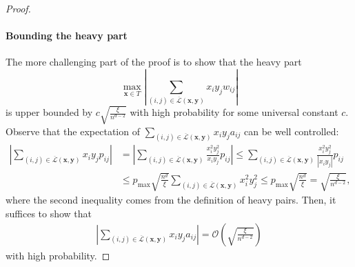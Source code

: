 \documentclass{article}
\theoremstyle{plain}
\theoremstyle{definition}
\theoremstyle{remark}
\newcommand{\OCal}{\mathcal{O}}
\def\bx{\bm{x}}
\def\by{\bm{y}}
\begin{document}
\begin{appendix}
\begin{center}
\begin{proof}
			\paragraph{Bounding the heavy part} The more challenging part of the proof is to show that the heavy part
			\[
			\max_{\bx \in T} \left|\sum_{ (i,j)\in {\overline{\mathcal{L}}(\bx, \by) }} x_i y_j w_{ij} \right|
			\]
			is upper bounded by $c \sqrt{\frac{\xi}{n^{d-2}}}$ with high probability for some universal constant $c$. Observe that the expectation of $\sum_{ (i,j)\in {\overline{\mathcal{L}}(\bx, \by) }} x_i y_j a_{ij}$ can be well controlled:
			\begin{align*}
				\left|\sum_{ (i,j)\in {\overline{\mathcal{L}}(\bx, \by) }} x_i y_j p_{ij} \right| & = \left|\sum_{ (i,j)\in {\overline{\mathcal{L}}(\bx, \by) }} \frac{x_i^2 y_j^2}{x_iy_j} p_{ij} \right| \leq \sum_{ (i,j)\in {\overline{\mathcal{L}}(\bx, \by) }} \frac{x_i^2 y_j^2}{|x_iy_j|} p_{ij}\\
				& \leq p_{\max} \sqrt{\frac{n^{d}}{\xi}}\sum_{ (i,j)\in {\overline{\mathcal{L}}(\bx, \by) }}x_i^2 y_j^2 \leq p_{\max} \sqrt{\frac{n^{d}}{\xi}} = \sqrt{\frac{\xi}{n^{d-2}}},
			\end{align*}
   where the second inequality comes from the definition of heavy pairs.
			Then, it suffices to show that 
			\begin{align} \label{eq: heavypartgoal-a}
				\left|\sum_{ (i,j)\in {\overline{\mathcal{L}}(\bx, \by) }} x_i y_j a_{ij} \right| = \OCal\left(\sqrt{\frac{\xi}{n^{d-2}}}\right)
			\end{align}
			with high probability.
			

\end{proof}
\end{center}
\end{appendix}
\end{document}
